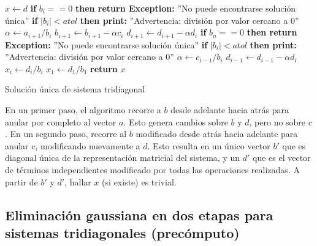 \begin{algorithm}[H]
\begin{algorithmic}[1]
    \State $x \gets d$ 
         \State \textbf{if} $b_i==0$ \textbf{then return Exception:} ''No puede encontrarse solución única''
        \State \textbf{if} $|b_i| < atol$ \textbf{then print:} ''Advertencia: división por valor cercano a 0''
        \State $\alpha \gets a_{i+1}/b_i$
        \State $b_{i+1} \gets b_{i+1} - \alpha c_i$ 
        \State $d_{i+1} \gets d_{i+1} - \alpha d_{i}$
    \EndFor
    \State \textbf{if} $b_n==0$ \textbf{then return Exception:} ''No puede encontrarse solución única''
        \State \textbf{if} $|b_i| < atol$ \textbf{then print:} ''Advertencia: división por valor cercano a 0''
        \State $\alpha \gets c_{i-1}/b_i$
        \State $d_{i-1} \gets d_{i-1} - \alpha d_{i}$
        \State $x_i \gets d_i/b_i$
    \EndFor
    \State $x_1 \gets d_1/b_1$
    \State \textbf{return} $x$
\EndFunction
\end{algorithmic}
\caption{Solución única de sistema tridiagonal}
\label{alg:EG_tridiagonal_sin_precomputo}
\end{algorithm}

En un primer paso, el algoritmo recorre a $b$ desde adelante hacia atrás para anular por completo al vector $a$. Esto genera cambios sobre $b$ y $d$, pero no sobre $c$. En un segundo paso, recorre al $b$ modificado desde atrás hacia adelante para anular c, modificando nuevamente a $d$. Esto resulta en un único vector $b'$ que es diagonal única de la representación matricial del sistema, y un $d'$ que es el vector de términos independientes modificado por todas las operaciones realizadas. A partir de $b'$ y $d'$, hallar $x$ (si existe) es trivial.

\subsection{Eliminaci\'on gaussiana en dos etapas para sistemas tridiagonales (precómputo)} \label{dos-etapas}
\label{EG_tridiagonales_con_precomputo}

